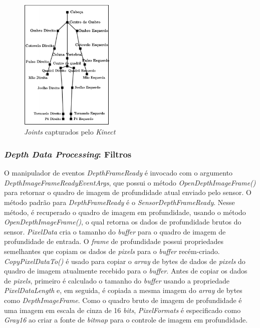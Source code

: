\begin{figure}[ht]
\centering
\includegraphics[width=0.4\textwidth]{images/human_joints.png}
\caption{\textit{Joints} capturados pelo \textit{Kinect}}
\label{fig:human_joints}
\end{figure}

\subsubsection{\textit{Depth Data Processing}: Filtros}\label{sec:depthDataProcessing}
O manipulador de eventos \textit{DepthFrameReady} é invocado com o argumento \textit{DepthImageFrameReadyEventArgs}, que possui o método \textit{OpenDepthImageFrame()} para retornar o quadro de imagem de profundidade atual enviado pelo sensor. O  método padrão para \textit{DepthFrameReady} é o \textit{SensorDepthFrameReady}. Nesse método, é recuperado o quadro de imagem em profundidade, usando o método \textit{OpenDepthImageFrame()}, o qual retorna os dados de profundidade brutos do sensor. \textit{PixelData} cria o tamanho do \textit{buffer} para o quadro de imagem de profundidade de entrada.
O \textit{frame} de profundidade possui propriedades semelhantes que copiam os dados de \textit{pixels} para o \textit{buffer} recém-criado. \textit{CopyPixelDataTo()} é usado para copiar o \textit{array} de bytes de dados de \textit{pixels} do quadro de imagem atualmente recebido para o \textit{buffer}. Antes de copiar os dados de \textit{pixels}, primeiro é calculado o tamanho do \textit{buffer} usando a propriedade \textit{PixelDataLength} e, em seguida, é copiada a mesma imagem do \textit{array} de bytes como \textit{DepthImageFrame}. Como o quadro bruto de imagem de profundidade é uma imagem em escala de cinza de 16 \textit{bits}, \textit{PixelFormats} é especificado  como \textit{Gray16} ao criar a fonte de \textit{bitmap} para o controle de imagem em profundidade.

